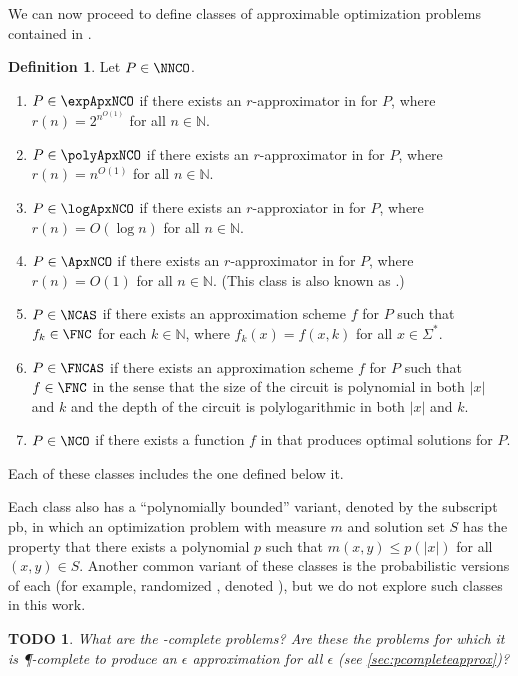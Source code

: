 \documentclass[]{article}
\theoremstyle{plain}
\newtheorem{todo}{TODO}
\theoremstyle{definition}
\newtheorem{definition}{Definition}
\newcommand{\pb}{\textsf{pb}}
\begin{document}
We can now proceed to define classes of approximable optimization problems contained in \NNCO.

\begin{definition}\label{def:ncx}
  Let $P\in\NNCO$.
  \begin{enumerate}
  \item $P\in\expApxNCO$ if there exists an $r$-approximator in \FNC{} for $P$, where $r(n)=2^{n^{O(1)}}$ for all $n\in\mathbb{N}$.
  \item $P\in\polyApxNCO$ if there exists an $r$-approximator in \FNC{} for $P$, where $r(n)=n^{O(1)}$ for all $n\in\mathbb{N}$.
  \item $P\in\logApxNCO$ if there exists an $r$-approxiator in \FNC{} for $P$, where $r(n)=O(\log n)$ for all $n\in\mathbb{N}$.
  \item $P\in\ApxNCO$ if there exists an $r$-approximator in \FNC{} for $P$, where $r(n)=O(1)$ for all $n\in\mathbb{N}$.
    (This class is also known as \NCX.)
  \item $P\in\NCAS$ if there exists an approximation scheme $f$ for $P$ such that $f_k\in\FNC$ for each $k\in\mathbb{N}$, where $f_k(x)=f(x, k)$ for all $x\in\Sigma^*$.
  \item $P\in\FNCAS$ if there exists an approximation scheme $f$ for $P$ such that $f\in\FNC$ in the sense that the size of the circuit is polynomial in both $|x|$ and $k$ and the depth of the circuit is polylogarithmic in both $|x|$ and $k$.
  \item $P\in\NCO$ if there exists a function $f$ in \FNC{} that produces optimal solutions for $P$.
  \end{enumerate}
\end{definition}

Each of these classes includes the one defined below it.

Each class also has a ``polynomially bounded'' variant, denoted by the subscript \pb, in which an optimization problem with measure $m$ and solution set $S$ has the property that there exists a polynomial $p$ such that $m(x, y) \leq p(|x|)$ for all $(x, y)\in S$.
Another common variant of these classes is the probabilistic versions of each (for example, randomized \NCAS{}, denoted \RNCAS), but we do not explore such classes in this work.

\begin{todo}
  What are the \PO-complete problems?
  Are these the problems for which it is \P-complete to produce an $\epsilon$ approximation for all $\epsilon$ (see \autoref{sec:pcompleteapprox})?
\end{todo}
\end{document}
